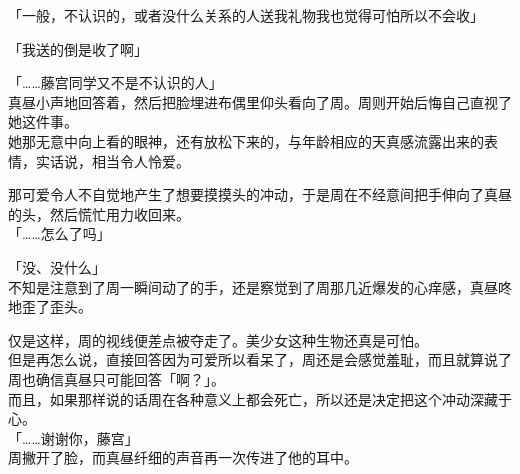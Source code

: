「一般，不认识的，或者没什么关系的人送我礼物我也觉得可怕所以不会收」

「我送的倒是收了啊」

「……藤宫同学又不是不认识的人」\\

真昼小声地回答着，然后把脸埋进布偶里仰头看向了周。周则开始后悔自己直视了她这件事。\\

她那无意中向上看的眼神，还有放松下来的，与年龄相应的天真感流露出来的表情，实话说，相当令人怜爱。

那可爱令人不自觉地产生了想要摸摸头的冲动，于是周在不经意间把手伸向了真昼的头，然后慌忙用力收回来。\\

「……怎么了吗」

「没、没什么」\\

不知是注意到了周一瞬间动了的手，还是察觉到了周那几近爆发的心痒感，真昼咚地歪了歪头。

仅是这样，周的视线便差点被夺走了。美少女这种生物还真是可怕。\\

但是再怎么说，直接回答因为可爱所以看呆了，周还是会感觉羞耻，而且就算说了周也确信真昼只可能回答「啊？」。\\

而且，如果那样说的话周在各种意义上都会死亡，所以还是决定把这个冲动深藏于心。\\

「……谢谢你，藤宫」\\

周撇开了脸，而真昼纤细的声音再一次传进了他的耳中。

